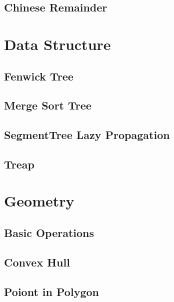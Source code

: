 \documentclass[10pt,landscape,a4paper,twocolumn]{article}
\begin{document}
\subsection{Chinese Remainder}




\section{Data Structure}
\subsection{Fenwick Tree}


\subsection{Merge Sort Tree}


\subsection{SegmentTree Lazy Propagation}


\subsection{Treap}



\section{Geometry}
\subsection{Basic Operations}


\subsection{Convex Hull}


\subsection{Poiont in Polygon}

\end{document}
